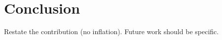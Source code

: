 \documentclass{article}
\begin{document}
\section{Conclusion}
\label{sec:conclusion}

Restate the contribution (no inflation). Future work should be specific.




%
\newpage


\end{document}
